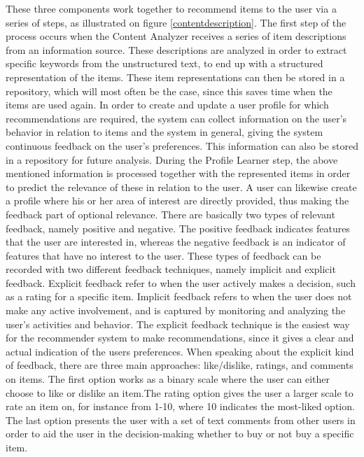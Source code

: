 These three components work together to recommend items to the user via a series of steps, as illustrated on figure \ref{contentdescription}.\newline 
The first step of the process occurs when the Content Analyzer receives a series of item descriptions from an information source. These descriptions are analyzed in order to extract specific keywords from the unstructured text, to end up with a structured representation of the items. These item representations can then be stored in a repository, which will most often be the case, since this saves time when the items are used again. In order to create and update a user profile for which recommendations are required, the system can collect information on the user's behavior in relation to items and the system in general, giving the system continuous feedback on the user's preferences. This information can also be stored in a repository for future analysis.\newline
During the Profile Learner step, the above mentioned information is processed together with the represented items in order to predict the relevance of these in relation to the user. A user can likewise create a profile where his or her area of interest are directly provided, thus making the feedback part of optional relevance.\newline
There are basically two types of relevant feedback, namely positive and negative. The positive feedback indicates features that the user are interested in, whereas the negative feedback is an indicator of features that have no interest to the user. \newline
These types of feedback can be recorded with two different feedback techniques, namely implicit and explicit feedback. Explicit feedback refer to when the user actively makes a decision, such as a rating for a specific item. Implicit feedback refers to when the user does not make any active involvement, and is captured by monitoring and analyzing the user's activities and behavior.\newline
The explicit feedback technique is the easiest way for the recommender system to make recommendations, since it gives a clear and actual indication of the users preferences. When speaking about the explicit kind of feedback, there are three main approaches: like/dislike, ratings, and comments on items.\newline
The first option works as a binary scale where the user can either choose to like or dislike an item.The rating option gives the user a larger scale to rate an item on, for instance from 1-10, where 10 indicates the most-liked option. The last option presents the user with a set of text comments from other users in order to aid the user in the decision-making whether to buy or not buy a specific item.\newline

